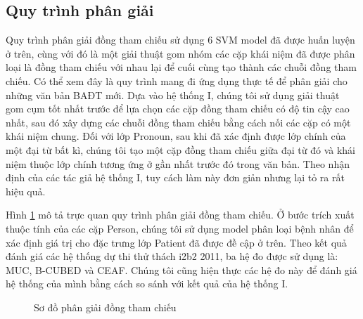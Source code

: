 \subsection*{Quy trình phân giải}
Quy trình phân giải đồng tham chiếu sử dụng 6 SVM model đã được huấn luyện ở trên, cùng với đó là một giải thuật gom nhóm các cặp khái niệm đã được phân loại là đồng tham chiếu với nhau lại để cuối cùng tạo thành các chuỗi đồng tham chiếu. Có thể xem đây là quy trình mang đi ứng dụng thực tế để phân giải cho những văn bản BAĐT mới. Dựa vào hệ thống I, chúng tôi sử dụng giải thuật gom cụm tốt nhất trước để lựa chọn các cặp đồng tham chiếu có độ tin cậy cao nhất, sau đó xây dựng các chuỗi đồng tham chiếu bằng cách nối các cặp có một khái niệm chung. Đối với lớp Pronoun, sau khi đã xác định được lớp chính của một đại từ bất kì, chúng tôi tạo một cặp đồng tham chiếu giữa đại từ đó và khái niệm thuộc lớp chính tương ứng ở gần nhất trước đó trong văn bản. Theo nhận định của các tác giả hệ thống I, tuy cách làm này đơn giản nhưng lại tỏ ra rất hiệu quả.

Hình \ref{fig:SDPG} mô tả trực quan quy trình phân giải đồng tham chiếu. Ở bước trích xuất thuộc tính của các cặp Person, chúng tôi sử dụng model phân loại bệnh nhân để xác định giá trị cho đặc trưng lớp Patient đã được đề cập ở trên. Theo kết quả đánh giá các hệ thống dự thi thử thách i2b2 2011, ba hệ đo được sử dụng là: MUC, B-CUBED và CEAF. Chúng tôi cũng hiện thực các hệ đo này để đánh giá hệ thống của mình bằng cách so sánh với kết quả của hệ thống I.

\begin{figure}[th]
\centering
{}
\caption{Sơ đồ phân giải đồng tham chiếu\label{fig:SDPG}}
\end{figure}

